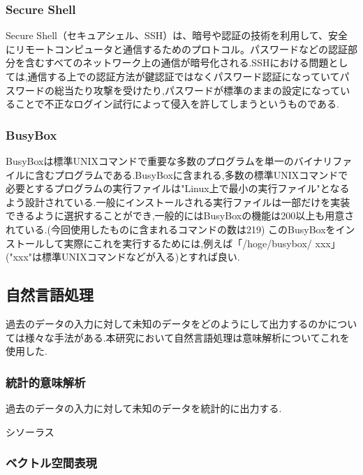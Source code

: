\subsubsection{Secure Shell}
\label{issue:Secure Shell}
Secure Shell（セキュアシェル、SSH）は、暗号や認証の技術を利用して、安全にリモートコンピュータと通信するためのプロトコル。パスワードなどの認証部分を含むすべてのネットワーク上の通信が暗号化される.\cite{ssh}SSHにおける問題としては,通信する上での認証方法が鍵認証ではなくパスワード認証になっていてパスワードの総当たり攻撃を受けたり,パスワードが標準のままの設定になっていることで不正なログイン試行によって侵入を許してしまうというものである.

\subsubsection{BusyBox}
\label{issue:BusyBox}
BusyBoxは標準UNIXコマンドで重要な多数のプログラムを単一のバイナリファイルに含むプログラムである.BusyBoxに含まれる,多数の標準UNIXコマンドで必要とするプログラムの実行ファイルは"Linux上で最小の実行ファイル"となるよう設計されている.一般にインストールされる実行ファイルは一部だけを実装できるように選択することができ,一般的にはBusyBoxの機能は200以上も用意されている.\cite{busybox}(今回使用したものに含まれるコマンドの数は219)
このBusyBoxをインストールして実際にこれを実行するためには,例えば「/hoge/busybox/ xxx」("xxx"は標準UNIXコマンドなどが入る)とすれば良い.

\subsection{自然言語処理}
\label{issue:NLP}
過去のデータの入力に対して未知のデータをどのようにして出力するのかについては様々な手法がある.本研究において自然言語処理は意味解析についてこれを使用した.

\subsubsection{統計的意味解析}
\label{issue:tokei}
過去のデータの入力に対して未知のデータを統計的に出力する.

\label{issue:Markov}

\label{issue:Copus}

\label{issue:Siso}
シソーラス\cite{siso}

\subsubsection{ベクトル空間表現}
\label{issue:Vector}

\label{issue:Word2vec}

